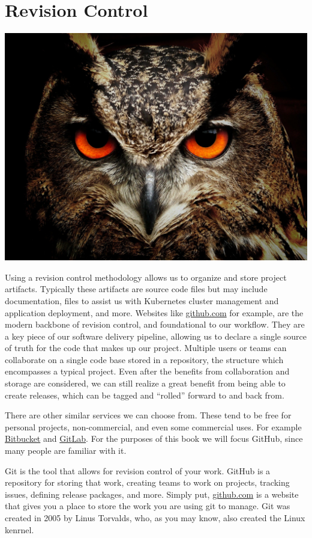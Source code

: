 \chapter{Revision Control}
\includegraphics[scale=0.20]{images/owl-50267_1920.jpg}

\justify{}
Using a revision control methodology allows us to organize and store project artifacts. Typically these
artifacts are source code files but may include documentation, files to assist us with Kubernetes cluster management and application
deployment, and more. Websites like \href{https://github.com}{github.com} for example, are the modern
backbone of revision control, and foundational to our workflow. They are a key piece of our software delivery pipeline,
allowing us to declare a single source of truth for the code that makes up our project. Multiple users or teams can collaborate on a
single code base stored in a repository, the structure which encompasses a typical project. Even after the benefits from collaboration and
storage are considered, we can still realize a great benefit from being able to create releases, which can be tagged and ``rolled''
forward to and back from.

\justify{}
There are other similar services we can choose from. These tend to be free for personal projects, non-commercial, and even some commercial
uses. For example \href{https://bitbucket.org/product}{Bitbucket} and \href{https://about.gitlab.com/}{GitLab}. For the purposes of this
book we will focus GitHub, since many people are familiar with it.

\justify{}
Git is the tool that allows for revision control of your work. GitHub is a repository for storing that work, creating
teams to work on projects, tracking issues, defining release packages, and more. Simply put, \href{github.com}{github.com}
is a website that gives you a place to store the work you are using git to manage. Git was created in 2005 by
Linus Torvalds, who, as you may know, also created the Linux kenrnel.

